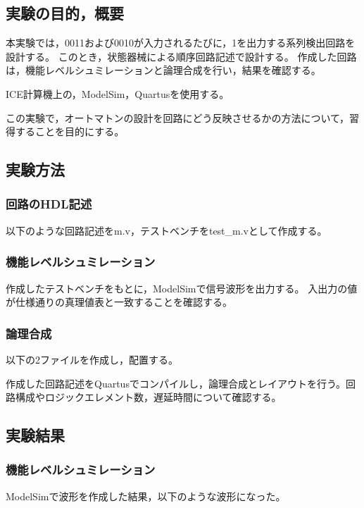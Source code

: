 
\subsection{実験の目的，概要}
本実験では，0011および0010が入力されるたびに，1を出力する系列検出回路を設計する。
このとき，状態器械による順序回路記述で設計する。
作成した回路は，機能レベルシュミレーションと論理合成を行い，結果を確認する。

ICE計算機上の，ModelSim，Quartusを使用する。

この実験で，オートマトンの設計を回路にどう反映させるかの方法について，習得することを目的にする。

\subsection{実験方法}
\subsubsection{回路のHDL記述}
以下のような回路記述をm.v，テストベンチをtest\_m.vとして作成する。



\subsubsection{機能レベルシュミレーション}
作成したテストベンチをもとに，ModelSimで信号波形を出力する。
入出力の値が仕様通りの真理値表と一致することを確認する。

\subsubsection{論理合成}
以下の2ファイルを作成し，配置する。



作成した回路記述をQuartusでコンパイルし，論理合成とレイアウトを行う。回路構成やロジックエレメント数，遅延時間について確認する。

\subsection{実験結果}
\subsubsection{機能レベルシュミレーション}
ModelSimで波形を作成した結果，以下のような波形になった。

